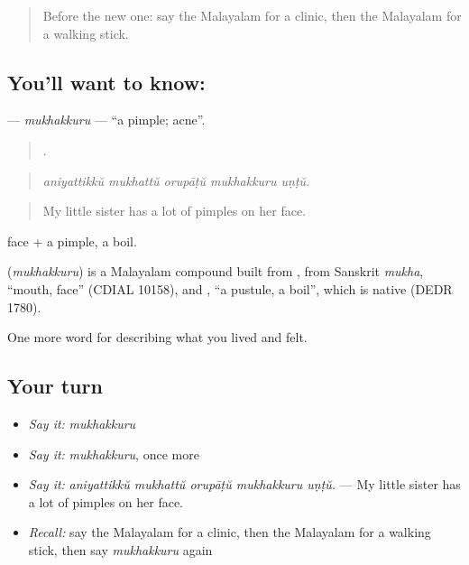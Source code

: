\label{lesson:ML-C540-mukhakkuru}



\begin{quote}
Before the new one: say the Malayalam for a clinic, then the Malayalam for a walking stick.
\end{quote}

\subsection*{You'll want to know: }
\textbf{} — \emph{mukhakkuru} — \textquotedblleft{}a pimple; acne\textquotedblright{}.

\begin{quote}
    .
\end{quote}

\begin{quote}
\emph{aniyattikkŭ mukhattŭ orupāṭŭ mukhakkuru uṇṭŭ.}
\end{quote}

\begin{quote}
My little sister has a lot of pimples on her face.
\end{quote}

 face +  a pimple, a boil.

\begin{cousinweb}
\textbf{} (\emph{mukhakkuru}) is a Malayalam compound built from , from Sanskrit \emph{mukha}, \textquotedblleft{}mouth, face\textquotedblright{} (CDIAL 10158), and , \textquotedblleft{}a pustule, a boil\textquotedblright{}, which is native (DEDR 1780).
\end{cousinweb}

\begin{grammarlens}[title={What you've built}]
One more word for describing what you lived and felt.
\end{grammarlens}

\subsection*{Your turn}
\begin{itemize}
\raggedright
  \item \emph{Say it:} \emph{mukhakkuru}
  \item \emph{Say it:} \emph{mukhakkuru}, once more
  \item \emph{Say it:} \emph{aniyattikkŭ mukhattŭ orupāṭŭ mukhakkuru uṇṭŭ.} — My little sister has a lot of pimples on her face.
  \item \emph{Recall:} say the Malayalam for a clinic, then the Malayalam for a walking stick, then say \emph{mukhakkuru} again
\end{itemize}

